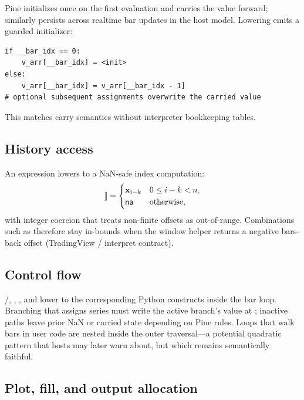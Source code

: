 \documentclass[11pt,a4paper]{article}
\renewcommand{\na}{\textsf{na}}
\providecommand{\llbracket}{[\![}
\providecommand{\rrbracket}{]\!]}
\begin{document}
Pine  initializes once on the first evaluation and carries the value
forward;  similarly persists across realtime bar updates in the
host model. Lowering emits a guarded initializer:
\begin{lstlisting}[style=python,numbers=none]
if __bar_idx == 0:
    v_arr[__bar_idx] = <init>
else:
    v_arr[__bar_idx] = v_arr[__bar_idx - 1]
# optional subsequent assignments overwrite the carried value
\end{lstlisting}
This matches carry semantics without interpreter bookkeeping tables.

\subsection{History access}

An expression  lowers to a NaN-safe index computation:
\begin{equation}
  \llbracket \series{x}[k] \rrbracket
  =
  \begin{cases}
    \series{x}_{\baridx - k} & 0 \le \baridx-k < \bars,\\
    \na & \text{otherwise,}
  \end{cases}
\end{equation}
with integer coercion that treats non-finite offsets as out-of-range.
Combinations such as  therefore stay
in-bounds when the window helper returns a negative bars-back offset
(TradingView / interpret contract).

\subsection{Control flow}

/, , , and  lower to
the corresponding Python constructs inside the bar loop. Branching that
assigns series must write the active branch's value at ;
inactive paths leave prior NaN or carried  state depending on Pine
rules. Loops that walk bars in user code are nested inside the outer
 traversal---a potential quadratic pattern that hosts
may later warn about, but which remains semantically faithful.

\subsection{Plot, fill, and output allocation}
\end{document}
